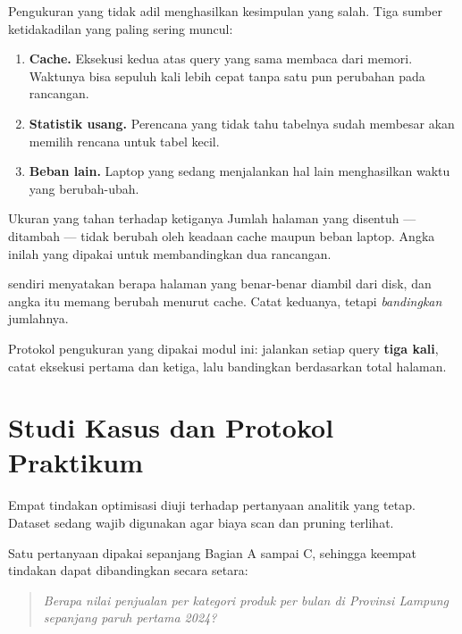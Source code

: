 Pengukuran yang tidak adil menghasilkan kesimpulan yang salah. Tiga sumber
ketidakadilan yang paling sering muncul:

\begin{enumerate}[leftmargin=1.4em]
  \item \textbf{Cache.} Eksekusi kedua atas query yang sama membaca dari
        memori. Waktunya bisa sepuluh kali lebih cepat tanpa satu pun
        perubahan pada rancangan.
  \item \textbf{Statistik usang.} Perencana yang tidak tahu tabelnya sudah
        membesar akan memilih rencana untuk tabel kecil.
  \item \textbf{Beban lain.} Laptop yang sedang menjalankan hal lain
        menghasilkan waktu yang berubah-ubah.
\end{enumerate}

\begin{konsep}{Ukuran yang tahan terhadap ketiganya}
Jumlah halaman yang disentuh ---  ditambah
 --- tidak berubah oleh keadaan cache maupun beban
laptop. Angka inilah yang dipakai untuk membandingkan dua rancangan.

 sendiri menyatakan berapa halaman yang benar-benar
diambil dari disk, dan angka itu memang berubah menurut cache. Catat keduanya,
tetapi \emph{bandingkan} jumlahnya.
\end{konsep}

Protokol pengukuran yang dipakai modul ini: jalankan setiap query
\textbf{tiga kali}, catat eksekusi pertama dan ketiga, lalu bandingkan
berdasarkan total halaman.

\section{Studi Kasus dan Protokol Praktikum}

Empat tindakan optimisasi diuji terhadap pertanyaan analitik yang tetap.
Dataset sedang wajib digunakan agar biaya scan dan pruning terlihat.

Satu pertanyaan dipakai sepanjang Bagian A sampai C, sehingga keempat tindakan
dapat dibandingkan secara setara:

\begin{quote}
\emph{Berapa nilai penjualan per kategori produk per bulan di Provinsi Lampung
sepanjang paruh pertama 2024?}
\end{quote}


